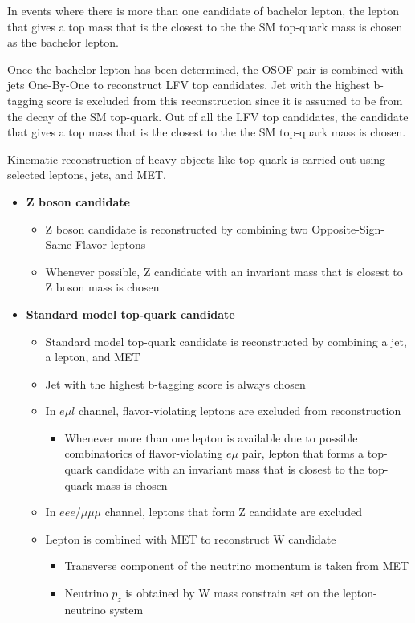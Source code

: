 In events where there is more than one candidate of bachelor lepton, the lepton that gives a top mass that is the closest to the the SM top-quark mass is chosen as the bachelor lepton.

Once the bachelor lepton has been determined, the OSOF pair is combined with jets One-By-One to reconstruct LFV top candidates. Jet with the highest b-tagging score is excluded from this reconstruction since it is assumed to be from the decay of the SM top-quark. Out of all the LFV top candidates, the candidate that gives a top mass that is the closest to the the SM top-quark mass is chosen.

Kinematic reconstruction of heavy objects like top-quark is carried out using selected leptons, jets, and MET.
\begin{itemize}
\item \textbf{Z boson candidate}
\begin{itemize}
\item Z boson candidate is reconstructed by combining two Opposite-Sign-Same-Flavor leptons 
\item Whenever possible, Z candidate with an invariant mass that is closest to Z boson mass is chosen
\end{itemize}
\item \textbf{Standard model top-quark candidate }
\begin{itemize}
\item Standard model top-quark candidate is reconstructed by combining a jet, a lepton, and MET
\item Jet with the highest b-tagging score is always chosen
\item In $e\mu l$ channel, flavor-violating leptons are excluded from reconstruction 
\begin{itemize}
\item Whenever more than one lepton is available due to possible combinatorics of flavor-violating $e\mu$ pair, lepton that forms a top-quark candidate with an invariant mass that is closest to the top-quark mass is chosen 
\end{itemize}
\item In $eee$/$\mu\mu\mu$ channel, leptons that form Z candidate are excluded 
\item Lepton is combined with MET to reconstruct W candidate 
\begin{itemize}
\item Transverse component of the neutrino momentum is taken from MET
\item Neutrino $p_z$ is obtained by W mass constrain set on the lepton-neutrino system 

\end{itemize}
\end{itemize}
\end{itemize}
